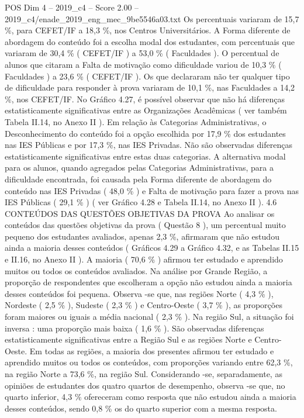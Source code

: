 \begin{textsample}{POS Dim 4 – 2019\_c4 – Score 2.00 – 2019\_c4/enade\_2019\_eng\_mec\_9be5546a03.txt}
Os percentuais variaram de 15,7 \%, para CEFET/IF a 18,3 \%, nos Centros Universitários.
A Forma diferente de abordagem do conteúdo foi a escolha modal dos estudantes, com percentuais que variaram de 30,4 \% ( CEFET/IF ) a 53,0 \% ( Faculdades ).
O percentual de alunos que citaram a Falta de motivação como dificuldade variou de 10,3 \% ( Faculdades ) a 23,6 \% ( CEFET/IF ).
Os que declararam não ter qualquer tipo de dificuldade para responder à prova variaram de 10,1 \%, nas Faculdades a 14,2 \%, nos CEFET/IF.
No Gráfico 4.27, é possível observar que não há diferenças estatisticamente significativas entre as Organizações Acadêmicas ( ver também Tabela II.14, no Anexo II ).
Em relação às Categorias Administrativas, o Desconhecimento do conteúdo foi a opção escolhida por 17,9 \% dos estudantes nas IES Públicas e por 17,3 \%, nas IES Privadas.
Não são observadas diferenças estatisticamente significativas entre estas duas categorias.
A alternativa modal para os alunos, quando agregados pelas Categorias Administrativas, para a dificuldade encontrada, foi causada pela Forma diferente de abordagem do conteúdo nas IES Privadas ( 48,0 \% ) e Falta de motivação para fazer a prova nas IES Públicas ( 29,1 \% ) ( ver Gráfico 4.28 e Tabela II.14, no Anexo II ). 4.6 CONTEÚDOS DAS QUESTÕES OBJETIVAS DA PROVA Ao analisar os conteúdos das questões objetivas da prova ( Questão 8 ), um percentual muito pequeno dos estudantes avaliados, apenas 2,3 \%, afirmaram que não estudou ainda a maioria desses conteúdos ( Gráficos 4.29 a Gráfico 4.32, e as Tabelas II.15 e II.16, no Anexo II ).
A maioria ( 70,6 \% ) afirmou ter estudado e aprendido muitos ou todos os conteúdos avaliados.
Na análise por Grande Região, a proporção de respondentes que escolheram a opção não estudou ainda a maioria desses conteúdos foi pequena.
Observa -se que, nas regiões Norte ( 4,3 \% ), Nordeste ( 2,5 \% ), Sudeste ( 2,3 \% ) e Centro-Oeste ( 3,7 \% ), as proporções foram maiores ou iguais a média nacional ( 2,3 \% ).
Na região Sul, a situação foi inversa : uma proporção mais baixa ( 1,6 \% ).
São observadas diferenças estatisticamente significativas entre a Região Sul e as regiões Norte e Centro-Oeste.
Em todas as regiões, a maioria dos presentes afirmou ter estudado e aprendido muitos ou todos os conteúdos, com proporções variando entre 62,3 \%, na região Norte a 73,6 \%, na região Sul.
Considerando -se, separadamente, as opiniões de estudantes dos quatro quartos de desempenho, observa -se que, no quarto inferior, 4,3 \% ofereceram como resposta que não estudou ainda a maioria desses conteúdos, sendo 0,8 \% os do quarto superior com a mesma resposta.

\end{textsample}
